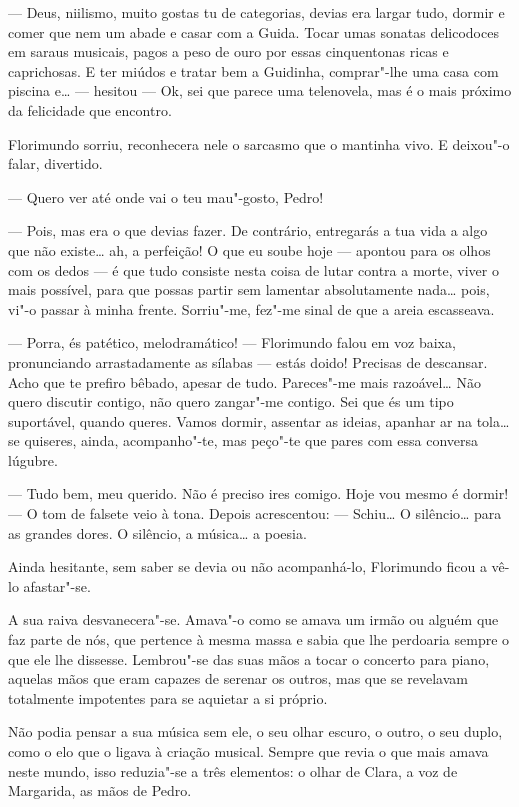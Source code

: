 --- Deus, niilismo, muito gostas tu de categorias, devias era largar tudo,
dormir e comer que nem um abade e casar com a Guida. Tocar umas sonatas
delicodoces em saraus musicais, pagos a peso de ouro por essas
cinquentonas ricas e caprichosas. E ter miúdos e tratar bem a Guidinha,
comprar"-lhe uma casa com piscina e\ldots{} --- hesitou ---  Ok, sei que
parece uma telenovela, mas é o mais próximo da felicidade que encontro.

Florimundo sorriu, reconhecera nele o sarcasmo que o mantinha vivo. E
deixou"-o falar, divertido.

--- Quero ver até onde vai o teu mau"-gosto, Pedro!

--- Pois, mas era o que devias fazer. De contrário, entregarás a tua vida
a algo que não existe\ldots{} ah, a perfeição! O que eu soube hoje --- apontou
para os olhos com os dedos --- é que tudo consiste nesta coisa de lutar
contra a morte, viver o mais possível, para que possas partir sem
lamentar absolutamente nada\ldots{} pois, vi"-o passar à minha frente.
Sorriu"-me, fez"-me sinal de que a areia escasseava.

--- Porra, és patético, melodramático! --- Florimundo falou em voz baixa,
pronunciando arrastadamente as sílabas --- estás doido! Precisas de
descansar. Acho que te prefiro bêbado, apesar de tudo. Pareces"-me mais
razoável\ldots{} Não quero discutir contigo, não quero zangar"-me contigo. Sei
que és um tipo suportável, quando queres. Vamos dormir, assentar as
ideias, apanhar ar na tola\ldots{} se quiseres, ainda, acompanho"-te, mas
peço"-te que pares com essa conversa lúgubre.

--- Tudo bem, meu querido. Não é preciso ires comigo. Hoje vou mesmo é
dormir! --- O tom de falsete veio à tona. Depois acrescentou: --- Schiu\ldots{} O
silêncio\ldots{} para as grandes dores. O silêncio, a música\ldots{} a poesia.

Ainda hesitante, sem saber se devia ou não acompanhá-lo, Florimundo
ficou a vê-lo afastar"-se.

A sua raiva desvanecera"-se. Amava"-o como se amava um irmão ou alguém que
faz parte de nós, que pertence à mesma massa e sabia que lhe perdoaria
sempre o que ele lhe dissesse. Lembrou"-se das suas mãos a tocar o
concerto para piano, aquelas mãos que eram capazes de serenar os outros,
mas que se revelavam totalmente impotentes para se aquietar a si
próprio.

Não podia pensar a sua música sem ele, o seu olhar escuro, o outro, o
seu duplo, como o elo que o ligava à criação musical. Sempre que revia o
que mais amava neste mundo, isso reduzia"-se a três elementos: o olhar de
Clara, a voz de Margarida, as mãos de Pedro.

